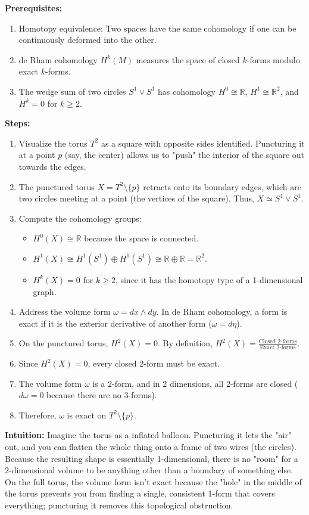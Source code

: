 \begin{solution}
\textbf{Prerequisites:}
\begin{enumerate}
    \item Homotopy equivalence: Two spaces have the same cohomology if one can be continuously deformed into the other.
    \item de Rham cohomology $H^k(M)$ measures the space of closed $k$-forms modulo exact $k$-forms.
    \item The wedge sum of two circles $S^1 \vee S^1$ has cohomology $H^0 \cong \mathbb{R}$, $H^1 \cong \mathbb{R}^2$, and $H^k = 0$ for $k \ge 2$.
\end{enumerate}

\textbf{Steps:}
\begin{enumerate}
    \item Visualize the torus $T^2$ as a square with opposite sides identified. Puncturing it at a point $p$ (say, the center) allows us to "push" the interior of the square out towards the edges.
    \item The punctured torus $X = T^2 \setminus \{p\}$ retracts onto its boundary edges, which are two circles meeting at a point (the vertices of the square). Thus, $X \simeq S^1 \vee S^1$.
    \item Compute the cohomology groups:
    \begin{itemize}
        \item $H^0(X) \cong \mathbb{R}$ because the space is connected.
        \item $H^1(X) \cong H^1(S^1) \oplus H^1(S^1) \cong \mathbb{R} \oplus \mathbb{R} = \mathbb{R}^2$.
        \item $H^k(X) = 0$ for $k \ge 2$, since it has the homotopy type of a 1-dimensional graph.
    \end{itemize}
    \item Address the volume form $\omega = dx \wedge dy$. In de Rham cohomology, a form is exact if it is the exterior derivative of another form ($\omega = d\eta$).
    \item On the punctured torus, $H^2(X) = 0$. By definition, $H^2(X) = \frac{\text{Closed 2-forms}}{\text{Exact 2-forms}}$.
    \item Since $H^2(X) = 0$, every closed 2-form must be exact.
    \item The volume form $\omega$ is a 2-form, and in 2 dimensions, all 2-forms are closed ($d\omega = 0$ because there are no 3-forms).
    \item Therefore, $\omega$ is exact on $T^2 \setminus \{p\}$.
\end{enumerate}

\textbf{Intuition:}
Imagine the torus as a inflated balloon. Puncturing it lets the "air" out, and you can flatten the whole thing onto a frame of two wires (the circles). Because the resulting shape is essentially 1-dimensional, there is no "room" for a 2-dimensional volume to be anything other than a boundary of something else. On the full torus, the volume form isn't exact because the "hole" in the middle of the torus prevents you from finding a single, consistent 1-form that covers everything; puncturing it removes this topological obstruction.
\end{solution}

